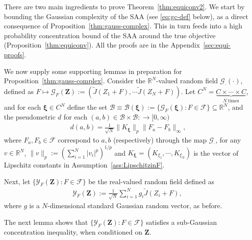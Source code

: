 \documentclass[11pt,leqno]{amsart}
\begin{document}
There are two main ingredients to prove Theorem~\ref{thm:equiconv2}. We start by bounding the Gaussian complexity of the SAA (see \eqref{eq:gc-def} below), as a direct consequence of Proposition~\ref{thm:gauss-complex}. This in turn feeds into a high probability concentration bound of the SAA around the true objective (Proposition~\ref{thm:equiconv}). All the proofs are in the Appendix~\ref{sec:equi-proofs}.

We now supply some supporting lemmas in preparation for Proposition~\ref{thm:gauss-complex}. Consider the $\mathbb R^N$-valued random field $\mathcal{G}_\cdot(\cdot)$, defined as
\(
    F \mapsto \mathcal{G}_F(\mathbf{Z}) := \left( \tilde{J}(Z_1+F), \cdots \tilde{J}(Z_N+F)\right).
\)
Let $C^N = \underset{N~\text{times}}{\underbrace{C\times\cdots\times C}}$, and for each $ \boldsymbol\xi  \in C^N$ define the set $\mathcal{B} \equiv \mathcal{B}( \boldsymbol\xi ) := \{\mathcal{G}_F( \boldsymbol\xi ) : F \in \mathcal{F}\} \subseteq \mathbb R^N$, and the pseudometric $d $ for each $(a,b) \in \mathcal{B} \times \mathcal{B} : \to [0,\infty)$
\begin{align}~\label{eq:pmetric}
    d(a,b) = \frac{1}{\sqrt{N}} \|K_{ \boldsymbol\xi }\|_{p} \|F_a - F_b\|_{\infty},
\end{align}
where $F_a,F_b \in \mathcal F$ correspond to $a,b$ (respectively) through the map $\mathcal{G}_\cdot$, for any $v \in \mathbb R^N$, $\|v\|_p := \left(\sum_{i=1}^N |v_i|^p\right)^{1/p}$ and $K_{ \boldsymbol\xi } = (K_{\xi_1},\cdots,K_{\xi_N})$ is the vector of  Lipschitz constants in Assumption~\ref{ass:LipschitzinF}.

Next, let $\{\mathcal{Y}_F(\mathbf Z) : F \in \mathcal{F}\}$ be the real-valued random field defined as
\begin{align}
    \mathcal{Y}_F(\mathbf Z) := \frac{1}{\sqrt{N}} \sum_{i=1}^N g_i \tilde{J}(Z_i+F),
\end{align}
where $g$ is a $N$-dimensional standard Gaussian random vector, as before. %

The next lemma shows that $\{\mathcal{Y}_F(\mathbf Z) : F \in \mathcal F\}$ satisfies a sub-Gaussian concentration inequality, when conditioned on $\mathbf Z$.
\end{document}
